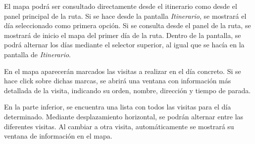 
El mapa podrá ser consultado directamente desde el itinerario como desde el panel principal de la ruta. Si se hace desde la pantalla \textit{Itinerario}, se mostrará el día seleccionado como primera opción. Si se consulta desde el panel de la ruta, se mostrará de inicio el mapa del primer día de la ruta. Dentro de la pantalla, se podrá alternar los días mediante el selector superior, al igual que se hacía en la pantalla de \textit{Itinerario}.
	
	En el mapa aparecerán marcados las visitas a realizar en el día concreto. Si se hace click sobre dichas marcas, se abrirá una ventana con información más detallada de la visita, indicando su orden, nombre, dirección y tiempo de parada.
	
	En la parte inferior, se encuentra una lista con todos las visitas para el día determinado. Mediante desplazamiento horizontal, se podrán alternar entre las diferentes visitas. Al cambiar a otra visita, automáticamente se mostrará su ventana de información en el mapa.
	

